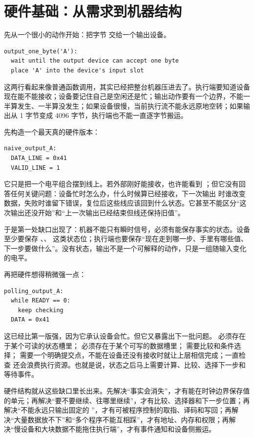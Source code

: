 \chapter{硬件基础：从需求到机器结构}

先从一个很小的动作开始：把字节  交给一个输出设备。

\begin{lstlisting}
output_one_byte('A'):
  wait until the output device can accept one byte
  place 'A' into the device's input slot
\end{lstlisting}

这两行看起来像普通函数调用，其实已经把整台机器压进去了。执行端要知道设备现在能不能接收；设备要记住自己是空闲还是忙；输出动作要有一个边界，不能一半算发生、一半算没发生；如果设备很慢，当前执行流不能永远原地空转；如果输出从 1 字节变成 4096 字节，执行端也不能一直逐字节搬运。

先构造一个最天真的硬件版本：

\begin{lstlisting}
naive_output_A:
  DATA_LINE = 0x41
  VALID_LINE = 1
\end{lstlisting}

它只是把一个电平组合摆到线上。若外部刚好能接收，也许能看到 ；但它没有回答任何关键问题：设备忙时怎么办，什么时候算已经接收，下一次输出  时谁改变数据，失败时谁留下错误，复位后这些线应该回到什么状态。它甚至不能区分“这次输出还没开始”和“上一次输出已经结束但线还保持旧值”。

于是第一处缺口出现了：机器不能只有瞬时信号，必须有能保存事实的状态。设备至少要保存 、、 这类状态位；执行端也要保存“现在走到哪一步、手里有哪些值、下一步要做什么”。没有状态，输出不是一个可解释的动作，只是一组随输入变化的电平。

再把硬件想得稍微强一点：

\begin{lstlisting}
polling_output_A:
  while READY == 0:
    keep checking
  DATA = 0x41
\end{lstlisting}

这已经比第一版强，因为它承认设备会忙。但它又暴露出下一批问题。 必须存在于某个可读的状态槽里； 必须存在于某个可写的数据槽里； 需要比较和条件选择； 需要一个明确提交点，不能在设备还没有接收时就让上层相信完成；一直检查  还会浪费执行资源。也就是说，状态之后马上需要计算、比较、选择下一步和等待事件。

硬件结构就从这些缺口里长出来。先解决“事实会消失”，才有能在时钟边界保存值的单元；再解决“要不要继续、往哪里继续”，才有比较、选择器和下一步位置；再解决“不能永远只输出固定的 ”，才有可被程序控制的取指、译码和写回；再解决“大量数据放不下”和“多个程序不能互相踩”，才有地址、内存和权限；再解决“慢设备和大块数据不能拖住执行端”，才有事件通知和设备侧搬运。

